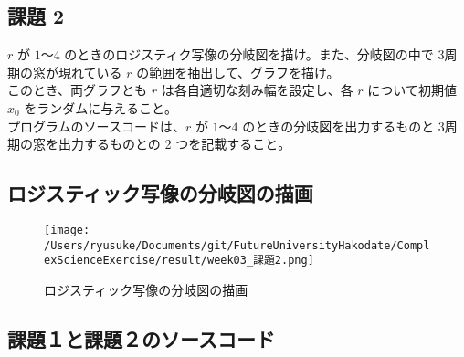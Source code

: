 \documentclass[a4j]{jsarticle}
\begin{document}
\newpage

\subsection{課題 2}
  $r$ が $1$～$4$ のときのロジスティク写像の分岐図を描け。また、分岐図の中で 3周期の窓が現れている $r$ の範囲を抽出して、グラフを描け。\\
このとき、両グラフとも $r$ は各自適切な刻み幅を設定し、各 $r$ について初期値 $x_{0}$ をランダムに与えること。\\
プログラムのソースコードは、$r$ が $1$～$4$ のときの分岐図を出力するものと 3周期の窓を出力するものとの 2 つを記載すること。\\

\subsection{ロジスティック写像の分岐図の描画}
\begin{figure}[htbp]
\begin{center}
\texttt{[image: /Users/ryusuke/Documents/git/FutureUniversityHakodate/ComplexScienceExercise/result/week03\_課題2.png]}
\caption{ロジスティック写像の分岐図の描画}
\end{center}
\end{figure}

\newpage

\subsection{課題１と課題２のソースコード}
\end{document}

